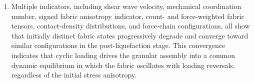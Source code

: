 \begin{enumerate}
\item Multiple indicators, including shear wave velocity, mechanical coordination number, signed fabric anisotropy indicator, count- and force-weighted fabric tensors, contact-density distributions, and force-chain configurations, all show that initially distinct fabric states progressively degrade and converge toward similar configurations in the post-liquefaction stage. This convergence indicates that cyclic loading drives the granular assembly into a common dynamic equilibrium in which the fabric oscillates with loading reversals, regardless of the initial stress anisotropy.

\end{enumerate}
